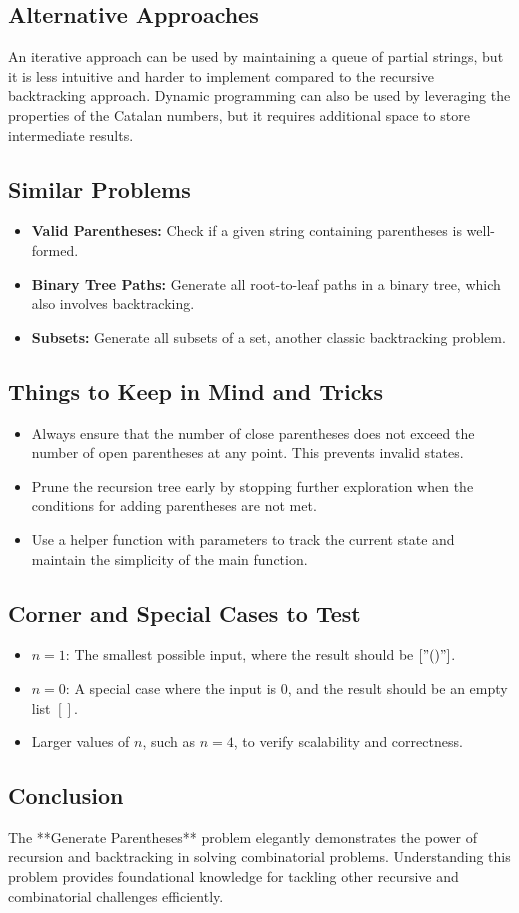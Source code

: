 \subsection*{Alternative Approaches}
An iterative approach can be used by maintaining a queue of partial strings, but it is less intuitive and harder to implement compared to the recursive backtracking approach. Dynamic programming can also be used by leveraging the properties of the Catalan numbers, but it requires additional space to store intermediate results.

\subsection*{Similar Problems}
\begin{itemize}
    \item \textbf{Valid Parentheses:} Check if a given string containing parentheses is well-formed.
    \item \textbf{Binary Tree Paths:} Generate all root-to-leaf paths in a binary tree, which also involves backtracking.
    \item \textbf{Subsets:} Generate all subsets of a set, another classic backtracking problem.
\end{itemize}

\subsection*{Things to Keep in Mind and Tricks}
\begin{itemize}
    \item Always ensure that the number of close parentheses does not exceed the number of open parentheses at any point. This prevents invalid states.
    \item Prune the recursion tree early by stopping further exploration when the conditions for adding parentheses are not met.
    \item Use a helper function with parameters to track the current state and maintain the simplicity of the main function.
\end{itemize}

\subsection*{Corner and Special Cases to Test}
\begin{itemize}
    \item \( n = 1 \): The smallest possible input, where the result should be \(["()"]\).
    \item \( n = 0 \): A special case where the input is \(0\), and the result should be an empty list \([]\).
    \item Larger values of \( n \), such as \( n = 4 \), to verify scalability and correctness.
\end{itemize}

\subsection*{Conclusion}
The **Generate Parentheses** problem elegantly demonstrates the power of recursion and backtracking in solving combinatorial problems. Understanding this problem provides foundational knowledge for tackling other recursive and combinatorial challenges efficiently.